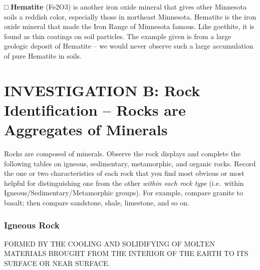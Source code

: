 \documentclass[
  letterpaper,
  twocolumn,
  portrait]{scrbook}
\begin{document}
□ \textbf{Hematite} (Fe2O3) is another iron oxide mineral that gives
other Minnesota soils a reddish color, especially those in northeast
Minnesota. Hematite is the iron oxide mineral that made the Iron Range
of Minnesota famous. Like goethite, it is found as thin coatings on soil
particles. The example given is from a large geologic deposit of
Hematite -- we would never observe such a large accumulation of pure
Hematite in soils.

\hypertarget{investigation-b-rock-identification-rocks-are-aggregates-of-minerals}{%
\section{INVESTIGATION B: Rock Identification -- Rocks are Aggregates of
Minerals}\label{investigation-b-rock-identification-rocks-are-aggregates-of-minerals}}

Rocks are composed of minerals. Observe the rock displays and complete
the following tables on igneous, sedimentary, metamorphic, and organic
rocks. Record the one or two characteristics of each rock that you find
most obvious or most helpful for distinguishing one from the other
\emph{within each rock type} (i.e.~within
Igneous/Sedimentary/Metamorphic groups). For example, compare granite to
basalt; then compare sandstone, shale, limestone, and so on.

\hypertarget{igneous-rock}{%
\subsubsection{Igneous Rock}\label{igneous-rock}}

FORMED BY THE COOLING AND SOLIDIFYING OF MOLTEN MATERIALS BROUGHT FROM
THE INTERIOR OF THE EARTH TO ITS SURFACE OR NEAR SURFACE.

 
  \providecommand{\huxb}[2]{\arrayrulecolor[RGB]{#1}\global\arrayrulewidth=#2pt}
  \providecommand{\huxvb}[2]{\color[RGB]{#1}\vrule width #2pt}
  \providecommand{\huxtpad}[1]{\rule{0pt}{#1}}
  \providecommand{\huxbpad}[1]{\rule[-#1]{0pt}{#1}}
\end{document}
